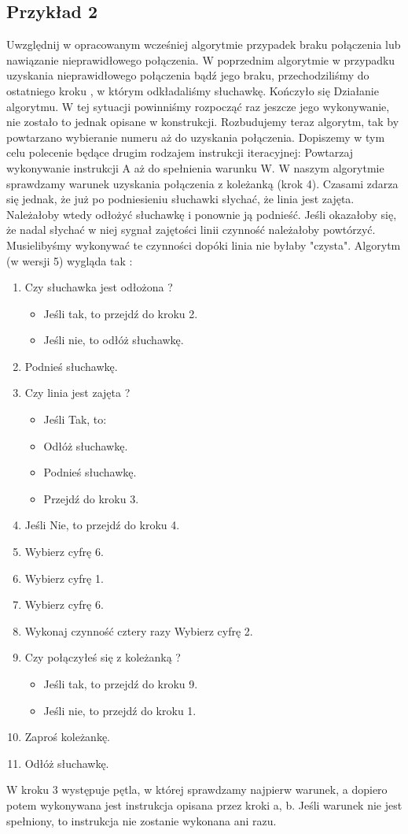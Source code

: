 \documentclass[a4paper,11pt]{article}
\begin{document}
\subsection{Przykład 2}
Uwzględnij w opracowanym wcześniej algorytmie przypadek braku połączenia lub 
nawiązanie nieprawidłowego połączenia. 
W poprzednim algorytmie w przypadku uzyskania nieprawidłowego połączenia bądź 
jego braku, przechodziliśmy do ostatniego kroku , w którym odkładaliśmy 
słuchawkę. Kończyło się Działanie algorytmu. W tej sytuacji powinniśmy rozpocząć 
raz jeszcze jego wykonywanie, nie zostało to jednak opisane w konstrukcji. 
Rozbudujemy teraz algorytm, tak by powtarzano wybieranie numeru aż do 
uzyskania połączenia. Dopiszemy w tym celu polecenie będące drugim rodzajem 
instrukcji iteracyjnej: 
Powtarzaj wykonywanie instrukcji A aż do spełnienia warunku W.
W naszym algorytmie sprawdzamy warunek uzyskania połączenia z 
koleżanką (krok 4). Czasami zdarza się jednak, że już po podniesieniu 
słuchawki słychać, że linia jest zajęta. Należałoby wtedy odłożyć słuchawkę 
i ponownie ją podnieść. Jeśli okazałoby się, że nadal słychać w niej sygnał 
zajętości linii czynność należałoby powtórzyć. Musielibyśmy wykonywać te 
czynności dopóki linia nie byłaby "czysta".
\newpage
Algorytm (w wersji 5) wygląda tak :
\begin{enumerate} 
\item Czy słuchawka jest odłożona ?
\begin{itemize}
\item Jeśli tak, to przejdź do kroku 2. 
\item Jeśli nie, to odłóż słuchawkę.
\end{itemize} 
\item Podnieś słuchawkę. 
\item Czy linia jest zajęta ? 
\begin{itemize}
\item Jeśli Tak, to: 
\item Odłóż słuchawkę. 
\item Podnieś słuchawkę. 
\item Przejdź do kroku 3. 
\end{itemize}
\item Jeśli Nie, to przejdź do kroku 4. 
\item Wybierz cyfrę 6. 
\item Wybierz cyfrę 1. 
\item Wybierz cyfrę 6. 
\item Wykonaj czynność cztery razy 
Wybierz cyfrę 2. 
\item Czy połączyłeś się z koleżanką ?
\begin{itemize}
\item Jeśli tak, to przejdź do kroku 9. 
\item Jeśli nie, to przejdź do kroku 1.
\end{itemize}
\item Zaproś koleżankę. 
\item Odłóż słuchawkę.
\end{enumerate} 
W kroku 3 występuje pętla, w której sprawdzamy najpierw warunek, a dopiero potem 
wykonywana jest instrukcja opisana przez kroki a, b. Jeśli warunek nie jest spełniony, to 
instrukcja nie zostanie wykonana ani razu. 
\end{document}
